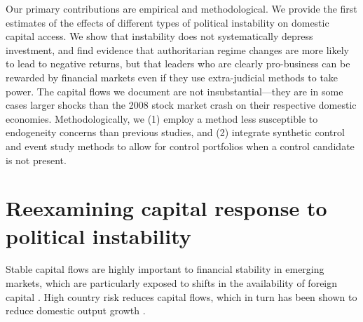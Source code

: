 \documentclass[12pt,final,fleqn]{article}
\theoremstyle{plain}
\begin{document}
Our primary contributions are empirical and methodological. We provide the first estimates of the effects of different types of political instability on domestic capital access. We show that instability does not systematically depress investment, and find evidence that authoritarian regime changes are more likely to lead to negative returns, but that leaders who are clearly pro-business can be rewarded by financial markets even if they use extra-judicial methods to take power. The capital flows we document are not insubstantial---they are in some cases larger shocks than the 2008 stock market crash on their respective domestic economies. Methodologically, we (1) employ a method less susceptible to endogeneity concerns than previous studies, and (2) integrate synthetic control and event study methods to allow for control portfolios when a control candidate is not present.




\section{Reexamining capital response to political instability}

Stable capital flows are highly important to financial stability in emerging markets, which are particularly exposed to shifts in the availability of foreign capital \citep{koepke2019drives, obstfeld2012financial, cohen2017global}. High country risk reduces capital flows, which in turn has been shown to reduce domestic output growth \citep{koepke2019drives}. 
\end{document}
